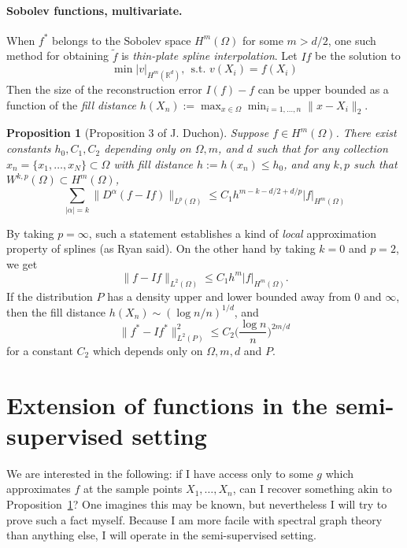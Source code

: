 \documentclass{article}
\newcommand{\Reals}{\mathbb{R}}
\newcommand{\abs}[1]{\left \lvert #1 \right \rvert}
\newcommand{\1}{\mathbf{1}}
\newcommand{\Rd}{\Reals^d}
\newcommand{\wt}[1]{\widetilde{#1}}
\newtheorem{proposition}{Proposition}
\theoremstyle{definition}
\theoremstyle{remark}
\begin{document}
\paragraph{Sobolev functions, multivariate.}
When $f^{\ast}$ belongs to the Sobolev space $H^m(\Omega)$ for some $m > d/2$, one such method for obtaining $\wt{f}$ is \emph{thin-plate spline interpolation}. Let $If$ be the solution to
\begin{equation*}
\min |v|_{H^m(\Rd)},~~\textrm{s.t. $v(X_i) = f(X_i)$}
\end{equation*}
Then the size of the reconstruction error $I(f) - f$ can be upper bounded as a function of the \emph{fill distance} $h(X_n) := \max_{x \in \Omega} \min_{i = 1,\ldots,n} \|x - X_i\|_2$. 

\begin{proposition}[Proposition 3 of J. Duchon]
	\label{prop:duchon_thin_plate_spline_approximation}
	Suppose $f \in H^m(\Omega)$. There exist constants $h_0, C_1, C_2$ depending only on $\Omega, m$, and $d$ such that for any collection $x_n = \{x_1,\ldots,x_N\} \subset \Omega$ with fill distance $h:= h(x_n) \leq h_0$, and any $k,p$ such that $W^{k,p}(\Omega) \subset H^m(\Omega)$, 
	\begin{equation*}
	\sum_{\abs{\alpha} = k} \|D^{\alpha}(f - If)\|_{L^p(\Omega)} \leq C_1 h^{m - k - d/2 + d/p} |f|_{H^m(\Omega)}
	\end{equation*}
\end{proposition}
By taking $p = \infty$, such a statement establishes a kind of \emph{local} approximation property of splines (as Ryan said). On the other hand by taking $k = 0$ and $p = 2$, we get
\begin{equation*}
\|f - If\|_{L^2(\Omega)} \leq C_1 h^{m} |f|_{H^m(\Omega)}.
\end{equation*}
If the distribution $P$ has a density upper and lower bounded away from $0$ and $\infty$, then the fill distance $h(X_n) \sim (\log n/n)^{1/d}$, and 
\begin{equation*}
\|f^{\ast} - If^{\ast}\|_{L^2(P)}^2 \leq C_2 \biggl(\frac{\log n}{n}\biggr)^{2m/d}
\end{equation*}
for a constant $C_2$ which depends only on $\Omega,m, d$ and $P$. 

\section{Extension of functions in the semi-supervised setting}

We are interested in the following: if I have access only to some $g$ which approximates $f$ at the sample points $X_1,\ldots,X_n$, can I recover something akin to Proposition~\ref{prop:duchon_thin_plate_spline_approximation}? One imagines this may be known, but nevertheless I will try to prove such a fact myself. Because I am more facile with spectral graph theory than anything else, I will operate in the semi-supervised setting.
\end{document}
